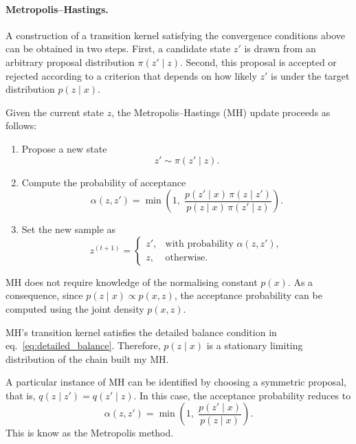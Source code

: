 \paragraph{Metropolis--Hastings.} A construction of a transition kernel satisfying the convergence conditions above can be obtained in two steps. First, a candidate state \(z'\) is drawn from an arbitrary proposal distribution \(\pi(z' \mid z)\). Second, this proposal is accepted or rejected according to a criterion that depends on how likely \(z'\) is under the target distribution \(p(z \mid x)\).


Given the current state \(z\), the Metropolis--Hastings (MH) update proceeds as follows:
\begin{enumerate}
  \item Propose a new state
  \[
  z' \sim \pi(z' \mid z).
  \]
  \item Compute the probability of acceptance
  \begin{equation}
      \alpha(z,z')
  =
  \min\!\left(
  1,\;
  \frac{p(z'\mid x)\,\pi(z \mid z')}
       {p(z\mid x)\,\pi(z' \mid z)}
  \right).
    \label{eq:MH_acceptance}    
  \end{equation}
    \item Set the new sample as
  \[
  z^{(t+1)} =
  \begin{cases}
    z', & \text{with probability } \alpha(z,z'),\\
    z,  & \text{otherwise.}
  \end{cases}
  \]
\end{enumerate}


\begin{remark}
    MH does not require knowledge of the normalising constant \(p(x)\). As a consequence, since \(p(z\mid x) \propto p(x,z)\), the acceptance probability can be computed using the joint density \(p(x,z)\).
\end{remark}



\begin{remark}
    MH's transition kernel satisfies the detailed balance condition in eq.~\eqref{eq:detailed_balance}. Therefore, \(p(z\mid x)\) is a stationary limiting distribution of the chain built my MH.
\end{remark}

\begin{remark}
    A particular instance of MH can be identified by choosing a symmetric proposal, that is, $q(z \mid z') = q(z' \mid z)$. In this case, the acceptance probability reduces to 
      \[
    \alpha(z,z')
    =
    \min\!\left(
    1,\;
    \frac{p(z'\mid x)}
        {p(z\mid x)}
    \right).
    \]
    This is know as the Metropolis method. 
\end{remark}

